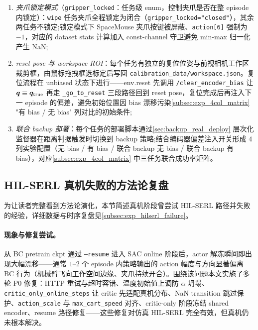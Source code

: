 \begin{enumerate}
  \item \emph{夹爪锁定模式}（\texttt{gripper\_locked}：任务级 enum，控制夹爪是否在整 episode 内锁定）：\texttt{wipe} 任务夹爪全程锁定为闭合（\texttt{gripper\_locked="closed"}），其余两任务不锁定;锁定模式下 SpaceMouse 夹爪按键被屏蔽、\texttt{action[6]} 强制为 $-1$，对应的 dataset stats 计算加入 const-channel 守卫避免 min-max 归一化产生 NaN;
  \item \emph{reset pose 与 workspace ROI}：每个任务有独立的复位位姿与前视相机工作区裁剪框，由鼠标拖拽框选标定后写回 \texttt{calibration\_data/workspace.json}。复位流程在 unbiased 状态下进行——env.reset 先调用 \texttt{/clear\_encoder\_bias} 让 $\bm{q} \equiv \bm{q}_\text{true}$ 再走 \texttt{\_go\_to\_reset} 三段路径回到 reset pose，复位完成后再注入下一 episode 的偏差，避免初始位置因 bias 漂移污染\cref{subsec:exp_4col_matrix} "有 bias / 无 bias" 列对比的初始条件;
  \item \emph{联合 backup 部署}：每个任务的部署脚本通过\cref{sec:backup_real_deploy} 层次化监督器在距离判据触发时切换到 backup 策略;结合编码器偏差注入开关形成 $4$ 列实验配置（无 bias / 有 bias / 联合 backup 无 bias / 联合 backup 有 bias），对应\cref{subsec:exp_4col_matrix} 中三任务联合成功率矩阵。
\end{enumerate}

\subsection{HIL-SERL 真机失败的方法论复盘}\label{subsec:hilserl_failure}

为让读者完整看到方法论演化，本节简述真机阶段曾尝试 HIL-SERL 路径并失败的经验，详细数据与时序复盘见\cref{subsec:exp_hilserl_failure}。

\paragraph{现象与修复尝试。}从 BC pretrain ckpt 通过 \texttt{--resume} 进入 SAC online 阶段后，actor 解冻瞬间即出现大幅漂移——通常 $1$–$2$ 个 episode 内策略输出的 action 幅度与方向显著偏离 BC 行为（机械臂飞向工作空间边缘、夹爪持续开合）。围绕该问题本文实施了多轮 P0 修复：HTTP 重试与超时容错、温度初始值上调防 $\alpha$ 坍塌、\texttt{critic\_only\_online\_steps} 让 critic 先适配真机分布、NaN transition 跳过保护、\texttt{action\_scale} 与 \texttt{max\_cart\_speed} 对齐、critic-only 阶段冻结 shared encoder、resume 路径修复——这些修复对仿真 HIL-SERL 完全有效，但真机仍未根本解决。

